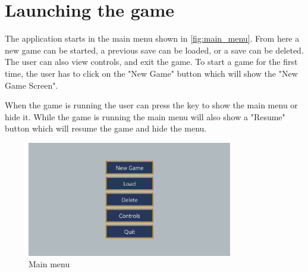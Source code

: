 \section{Launching the game}
The application starts in the main menu shown in \autoref{fig:main_menu}.
From here a new game can be started, a previous save can be loaded, or a save can be deleted.
The user can also view controls, and exit the game.
To start a game for the first time, the user has to click on the "New Game" button which will show the "New Game Screen".

When the game is running the user can press the \keys{\escwin} key to show the main menu or hide it.
While the game is running the main menu will also show a "Resume" button which will resume the game and hide the menu.

\begin{figure}[H]
    \centering
    \includegraphics[width=0.8\textwidth]{chapters/user_manual/resources/main-menu.png}
    \caption{Main menu}
    \label{fig:main_menu}
\end{figure}